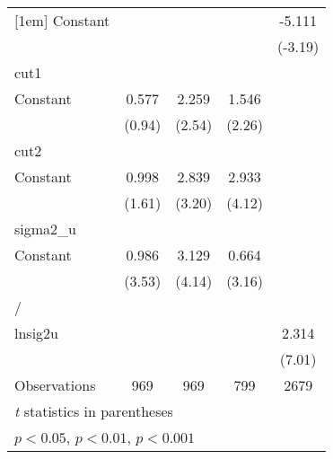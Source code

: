 {\begin{longtable}{l*{4}{c}}
[1em]
Constant        &                  &                  &                  &   -5.111\sym{**} \\
                &                  &                  &                  &  (-3.19)         \\
\hline
cut1            &                  &                  &                  &                  \\
Constant        &    0.577         &    2.259\sym{*}  &    1.546\sym{*}  &                  \\
                &   (0.94)         &   (2.54)         &   (2.26)         &                  \\
\hline
cut2            &                  &                  &                  &                  \\
Constant        &    0.998         &    2.839\sym{**} &    2.933\sym{***}&                  \\
                &   (1.61)         &   (3.20)         &   (4.12)         &                  \\
\hline
sigma2\_u        &                  &                  &                  &                  \\
Constant        &    0.986\sym{***}&    3.129\sym{***}&    0.664\sym{**} &                  \\
                &   (3.53)         &   (4.14)         &   (3.16)         &                  \\
\hline
/               &                  &                  &                  &                  \\
lnsig2u         &                  &                  &                  &    2.314\sym{***}\\
                &                  &                  &                  &   (7.01)         \\
\hline
Observations    &      969         &      969         &      799         &     2679         \\
\hline\hline
\multicolumn{5}{l}{\footnotesize \textit{t} statistics in parentheses}\\
\multicolumn{5}{l}{\footnotesize \sym{*} \(p<0.05\), \sym{**} \(p<0.01\), \sym{***} \(p<0.001\)}\\
\end{longtable}
}
